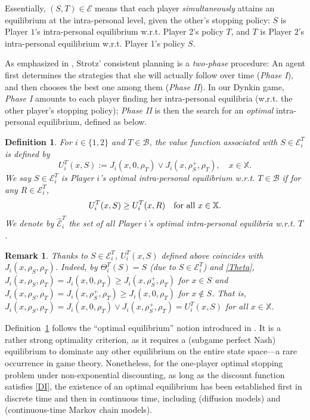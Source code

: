 \documentclass[11pt,reqno]{article}
\numberwithin{equation}{section}
\newtheorem{definition}{Definition}[section]
\newtheorem{remark}{Remark}[section]
\newcommand{\cE}{\mathcal{E}}
\newcommand{\X}{\mathbb{X}}
\newcommand{\B}{\mathcal{B}}
\begin{document}
Essentially, $(S,T)\in\cE$ means that each player {\it simultaneously} attains an equilibrium at the intra-personal level, %
given the other's stopping policy: $S$ is Player $1$'s intra-personal equilibrium w.r.t. Player 2's policy $T$, and $T$ is Player $2$'s intra-personal equilibrium w.r.t. Player 1's policy $S$.

As emphasized in \cite{HZ19, HZ20}, Strotz' consistent planning is a {\it two-phase} procedure: An agent first determines the strategies that she will actually follow over time ({\it Phase I}), and then chooses the best one among them ({\it Phase II}). In our Dynkin game, {\it Phase I} amounts to each player finding her intra-personal equilibria (w.r.t. the other player's stopping policy); {\it Phase II} is then the search for an {\it optimal} intra-personal equilibrium, defined as below.

\begin{definition}\label{def:optimal E}
For $i\in\{1,2\}$ and $T\in\B$, the value function associated with $S\in\cE_i^T$ is defined by 
\[
U_i^T(x, S):=J_i(x,0,\rho_T)\vee J_i(x,\rho^+_S,\rho_T),\quad  x\in\X. 
\]
We say $S\in\cE_i^T$ is Player $i$'s optimal intra-personal equilibrium w.r.t. $T\in\B$ if for any $R\in\cE_i^T$,
\[
U_i^T(x,S)\ge U_i^T(x,R)\quad \hbox{for all}\ x\in\X. 
\]
We denote by $\widehat{\cE}_i^T$ the set of all Player $i$'s optimal intra-personal equilibria w.r.t. $T$. 
\end{definition}

\begin{remark}
Thanks to $S\in\cE_i^T$, $U_i^T(x,S)$ defined above coincides with $J_i(x,\rho_S,\rho_T)$. Indeed, by $\Theta_i^T(S) = S$ (due to $S\in\cE_i^T$) and \eqref{Theta}, $J_i(x,\rho_S,\rho_T) = J_i(x,0,\rho_T)\ge J_i(x,\rho^+_S,\rho_T)$ for $x\in S$ and $J_i(x,\rho_S,\rho_T) =  J_i(x,\rho^+_S,\rho_T)\ge J_i(x,0,\rho_T)$ for $x\notin S$. That is, $J_i(x,\rho_S,\rho_T) = J_i(x,0,\rho_T)\vee J_i(x,\rho^+_S,\rho_T) = U_i^T(x,S)$ for all $x\in\X$. 
\end{remark}

Definition~\ref{def:optimal E} follows the ``optimal equilibrium'' notion introduced in \cite{HZ19}. It is a rather strong optimality criterion, as it requires a (subgame perfect Nash) equilibrium to dominate any other equilibrium on the entire state space---a rare occurrence in game theory. Nonetheless, for the one-player optimal stopping problem under non-exponential discounting, as long as the discount function satisfies \eqref{DI}, the existence of an optimal equilibrium has been established first in discrete time \cite{HZ19} and then in continuous time, including \cite{HZ20, HW20} (diffusion models) and \cite{https://doi.org/10.1111/mafi.12293} (continuous-time Markov chain models).
\end{document}
